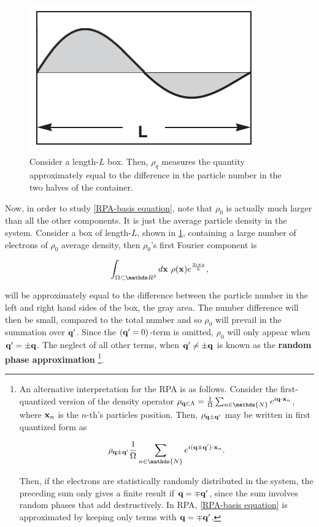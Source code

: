 \documentclass{homework}
\begin{document}
\begin{figure}
    \centering
    \includegraphics[scale = .5]{figs/Jellium model/RPA-fig.png} 
    \caption{Consider a length-$L$ box. Then, $\rho_q$ measures the quantity approximately equal to the difference in the particle number in the two halves of the container. }
    \label{fig:RPA-box}
\end{figure}

Now, in order to study \cref{RPA-basis equation}, note that $\rho_0$ is actually much larger than all the other components. It is just the average particle density in the system. Consider a box of length-$L$, shown in \cref{fig:RPA-box}, containing a large number of electrons of $\rho_0$ average density, then $\rho_0$'s first Fourier component is 

$$
    \int_{\Omega \subset \R^3} d{\bf x} \blanky \rho({\bf x}) e^{\frac{2i \pi x}{L}},
$$

will be approximately equal to the difference between the particle number in the left and right hand sides of the box, the gray area. The number difference will then be small, compared to the total number and so $\rho_0$ will prevail in the summation over ${\bf q}'$. Since the $({\bf q}' = 0)$-term is omitted, $\rho_0$ will only appear when ${\bf q}' = \pm {\bf q}$. The neglect of all other terms, when ${\bf q}' \neq \pm {\bf q}$ is known as the \textbf{random phase approximation} \footnote{An alternative interpretation for the RPA is as follows. Consider the first-quantized version of the density operator $\rho_{{\bf q} \in \Lambda} = \frac{1}{\Omega} \sum_{n \in \mathds{N}} e^{i {\bf q} \cdot {\bf x}_n}$, where ${\bf x}_n$ is the $n$-th's particles position. Then, $\rho_{{\bf q} \pm {\bf q}'}$ may be written in first quantized form as 

$$
    \rho_{{\bf q} \pm {\bf q}'} \frac{1}{\Omega} \sum_{n \in \mathds{N}} e^{i ({\bf q} \pm {\bf q}') \cdot {\bf x}_n}.
$$

Then, if the electrons are statistically randomly distributed in the system, the preceding sum only gives a finite result if ${\bf q} = \mp {\bf q'}$, since the sum involves random phases that add destructively. In RPA, \cref{RPA-basis equation} is approximated by keeping only terms with ${\bf q} = \mp {\bf q}'$. }.\\
\end{document}
